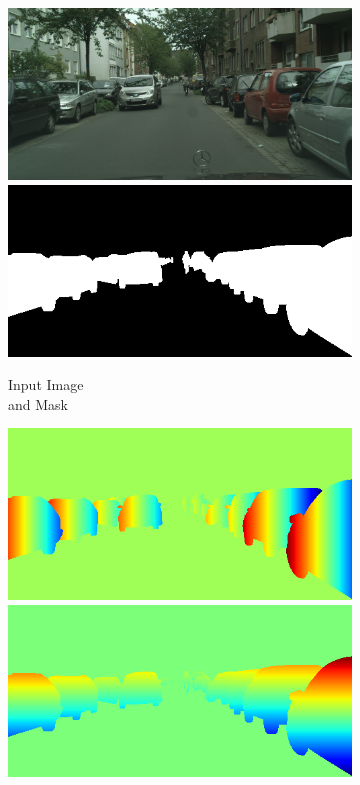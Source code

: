 \begin{figure}[t]
\begin{center}
\begin{subfigure}[t]{0.24\linewidth}
  \includegraphics[width=\linewidth]{figures/input.png}
  \includegraphics[width=\linewidth]{figures/mask.png}
  \caption{Input Image\\and Mask}
\end{subfigure}
\begin{subfigure}[t]{0.24\linewidth}
  \includegraphics[width=\linewidth]{figures/gt_x.png}
  \includegraphics[width=\linewidth]{figures/gt_y.png}

\end{subfigure}
\end{center}
\end{figure}
